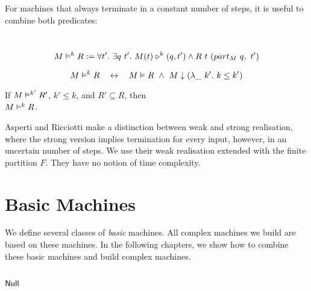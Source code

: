 For machines that always terminate in a constant number of steps, it is useful to combine both predicates:
\begin{definition}
  \label{def:RealiseIn}
  ~
  \[
    M \mathrel{\vDash^{k}} R :=
    \forall t'.~
    \exists q~t'.~
    M(t) \mathrel{\triangleright}^k(q, t') \land R~t~(part_M~q,~t')
  \]
\end{definition}

\begin{lemma}
  \label{lem:Realise_total}
  \[
    M \mathrel{\vDash^{k}} R
    \quad\mathbin{\leftrightarrow}\quad
    M \mathrel{\vDash} R ~\land~
    M \mathrel{\downarrow} (\lambda \_~k'.~k \le k')
  \]
\end{lemma}

\begin{lemma}
  \label{lem:RealiseIn_monotone}
  If $M \mathrel{\vDash^{k'}} R'$, $k' \leq k$, and $R' \subseteq R$, then \\
  $M \mathrel{\vDash^{k}} R$.
\end{lemma}

Asperti and Ricciotti \cite{asperti2015} make a distinction between weak and strong realisation, where the strong version implies termination for
every input, however, in an uncertain number of steps.  We use their weak realisation extended with the finite partition $F$.  They have no notion of
time complexity.


\section{Basic Machines}
\label{sec:basic_machines}

We define several classes of \textit{basic} machines.  All complex machines we build are based on these machines.  In the following chapters, we show
how to combine these basic machines and build complex machines.


\subsection{$\mathsf{Null}$}
\label{sec:Null}


